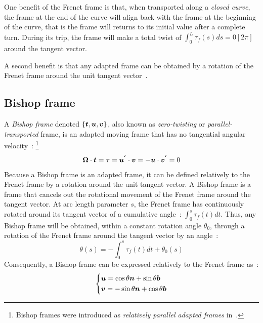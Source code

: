 One benefit of the Frenet frame is that, when transported along a \emph{closed curve}, the frame at the end of the curve will align back with the frame at the beginning of the curve, that is the frame will returns to its initial value after a complete turn. During its trip, the frame will make a total twist of $\int_0^L \tau_f(s)ds = 0[2\pi]$ around the tangent vector.

A second benefit is that any adapted frame can be obtained by a rotation of the Frenet frame around the unit tangent vector~\cite[p.2]{Guggenheimer1989}.

\subsection{Bishop frame}\label{sec:bishop}

A \emph{Bishop frame} denoted $\{\boldsymbol{t},\boldsymbol{u},\boldsymbol{v}\}$, also known as \emph{zero-twisting} or \emph{parallel-transported} frame, is an adapted moving frame that has no tangential angular velocity~: \footnote{Bishop frames were introduced as \emph{relatively parallel adapted frames} in~\cite{Bishop1975}.}
\begin{equation}
	\boldsymbol{\Omega} \cdot \boldsymbol{t} = \tau =\boldsymbol{u^{'}} \cdot \boldsymbol{v} = - \boldsymbol{u} \cdot \boldsymbol{v^{'}} = 0
\end{equation}
Because a Bishop frame is an adapted frame, it can be defined relatively to the Frenet frame by a rotation around the unit tangent vector. A Bishop frame is a frame that cancels out the rotational movement of the Frenet frame around the tangent vector. At arc length parameter $s$, the Frenet frame has continuously rotated around its tangent vector of a cumulative angle~: $\int_0^s \tau_f(t)dt$. Thus, any Bishop frame will be obtained, within a constant rotation angle $\theta_0$, through a rotation of the Frenet frame around the tangent vector by an angle~:
\begin{equation}
	\theta(s)  =  - \int_0^s \tau_f(t)dt + \theta_0(s)
\end{equation}
Consequently, a Bishop frame can be expressed relatively to the Frenet frame as~:
\begin{equation}
	\left\{
	\begin{aligned}
		&\boldsymbol{u} = \cos \theta \boldsymbol{n} +  \sin \theta \boldsymbol{b}\\
		&\boldsymbol{v} = -\sin \theta \boldsymbol{n} +  \cos \theta \boldsymbol{b}
	\end{aligned}
	\right.
\end{equation}
